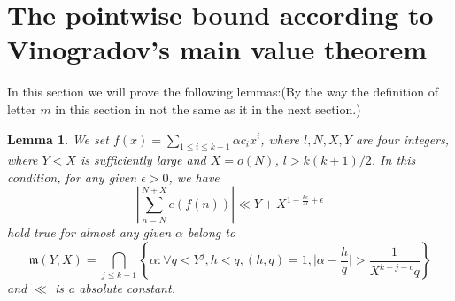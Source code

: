 \documentclass[10pt]{article}
\newtheorem{lemma}{Lemma}[section]
\begin{document}
\section{The pointwise bound according to Vinogradov's main value theorem}
In this section we will prove the following lemmas:(By the way the definition of letter $m$ in this section in not the same as it in the next section.)
\begin{lemma}
We set $f(x)=\sum_{1\leq i\leq k+1}\alpha c_{i}x^i$, where $l,N,X,Y$ are four integers, where $Y<X$ is sufficiently large and $X=o(N)$, $l>k(k+1)/2$. In this condition, for any given $\epsilon>0$, we have
\begin{equation}
|\sum\limits_{n=N}^{N+X}e(f(n))|\ll Y+X^{1-\frac{kc}{4l}+\epsilon}
\end{equation}
hold true for almost any given $\alpha$ belong to
\[
\mathfrak{m}(Y,X)=\bigcap_{j\leq k-1}\left\{\alpha:\forall q<Y^j,h<q,(h,q)=1,\Big|\alpha-\frac{h}{q}\Big|>\frac{1}{X^{k-j-c}q}\right\}
\]
and $\ll$ is a absolute constant.
\end{lemma}
\end{document}
